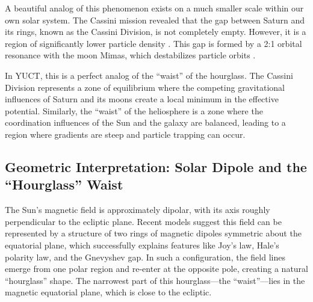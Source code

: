 \documentclass[12pt,a4paper]{article}
\theoremstyle{remark}
\begin{document}
	A beautiful analog of this phenomenon exists on a much smaller scale within our own solar system. The Cassini mission revealed that the gap between Saturn and its rings, known as the Cassini Division, is not completely empty. However, it is a region of significantly lower particle density . This gap is formed by a 2:1 orbital resonance with the moon Mimas, which destabilizes particle orbits .
	
	In YUCT, this is a perfect analog of the ``waist'' of the hourglass. The Cassini Division represents a zone of equilibrium where the competing gravitational influences of Saturn and its moons create a local minimum in the effective potential. Similarly, the ``waist'' of the heliosphere is a zone where the coordination influences of the Sun and the galaxy are balanced, leading to a region where gradients are steep and particle trapping can occur.
	
	\subsection{Geometric Interpretation: Solar Dipole and the ``Hourglass'' Waist}
	\label{subsec:coord:dipole_geometry}
	
	The Sun's magnetic field is approximately dipolar, with its axis roughly perpendicular to the ecliptic plane. Recent models suggest this field can be represented by a structure of two rings of magnetic dipoles symmetric about the equatorial plane, which successfully explains features like Joy's law, Hale's polarity law, and the Gnevyshev gap. In such a configuration, the field lines emerge from one polar region and re-enter at the opposite pole, creating a natural ``hourglass'' shape. The narrowest part of this hourglass—the ``waist''—lies in the magnetic equatorial plane, which is close to the ecliptic.
	
\end{document}
